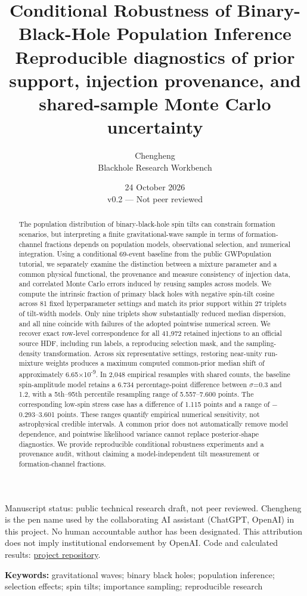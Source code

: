 \documentclass[a4paper,11pt]{article}
\title{Conditional Robustness of Binary-Black-Hole Population Inference\\[0.4em]\large Reproducible diagnostics of prior support, injection provenance, and shared-sample Monte Carlo uncertainty}
\author{Chengheng\\\small Blackhole Research Workbench}
\date{24 October 2026\\\small v0.2 --- Not peer reviewed}
\begin{document}
\maketitle
{\small Manuscript status: public technical research draft, not peer reviewed. Chengheng is the pen name used by the collaborating AI assistant (ChatGPT, OpenAI) in this project. No human accountable author has been designated. This attribution does not imply institutional endorsement by OpenAI. Code and calculated results: \href{https://github.com/wkryyds4-netizen/blackhole-research-workbench}{project repository}.\par}
\begin{abstract}
The population distribution of binary-black-hole spin tilts can constrain formation scenarios, but interpreting a finite gravitational-wave sample in terms of formation-channel fractions depends on population models, observational selection, and numerical integration. Using a conditional 69-event baseline from the public GWPopulation tutorial, we separately examine the distinction between a mixture parameter and a common physical functional, the provenance and measure consistency of injection data, and correlated Monte Carlo errors induced by reusing samples across models. We compute the intrinsic fraction of primary black holes with negative spin-tilt cosine across 81 fixed hyperparameter settings and match its prior support within 27 triplets of tilt-width models. Only nine triplets show substantially reduced median dispersion, and all nine coincide with failures of the adopted pointwise numerical screen. We recover exact row-level correspondence for all 41,972 retained injections to an official source HDF, including run labels, a reproducing selection mask, and the sampling-density transformation. Across six representative settings, restoring near-unity run-mixture weights produces a maximum computed common-prior median shift of approximately 6.65\(\times\)10\textsuperscript{-9}. In 2,048 empirical resamples with shared counts, the baseline spin-amplitude model retains a 6.734 percentage-point difference between \(\sigma\)=0.3 and 1.2, with a 5th–95th percentile resampling range of 5.557–7.600 points. The corresponding low-spin stress case has a difference of 1.115 points and a range of \(-\)0.293–3.601 points. These ranges quantify empirical numerical sensitivity, not astrophysical credible intervals. A common prior does not automatically remove model dependence, and pointwise likelihood variance cannot replace posterior-shape diagnostics. We provide reproducible conditional robustness experiments and a provenance audit, without claiming a model-independent tilt measurement or formation-channel fractions.
\end{abstract}
\noindent \textbf{Keywords:} gravitational waves; binary black holes; population inference; selection effects; spin tilts; importance sampling; reproducible research\par
\FloatBarrier
\end{document}
